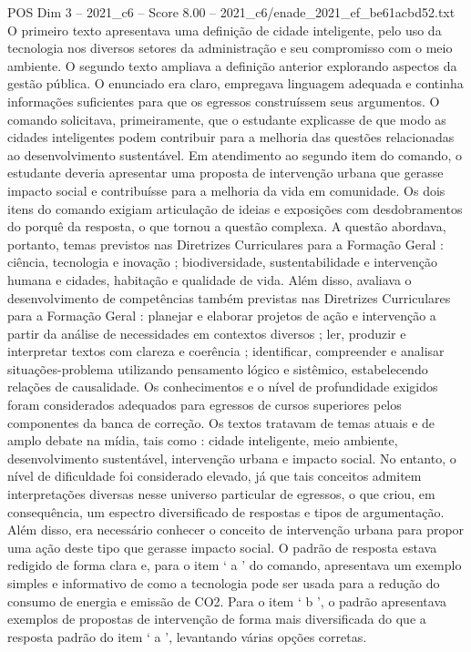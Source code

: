 \begin{textsample}{POS Dim 3 – 2021\_c6 – Score 8.00 – 2021\_c6/enade\_2021\_ef\_be61acbd52.txt}
O primeiro texto apresentava uma definição de cidade inteligente, pelo uso da tecnologia nos diversos setores da administração e seu compromisso com o meio ambiente.
O segundo texto ampliava a definição anterior explorando aspectos da gestão pública.
O enunciado era claro, empregava linguagem adequada e continha informações suficientes para que os egressos construíssem seus argumentos.
O comando solicitava, primeiramente, que o estudante explicasse de que modo as cidades inteligentes podem contribuir para a melhoria das questões relacionadas ao desenvolvimento sustentável.
Em atendimento ao segundo item do comando, o estudante deveria apresentar uma proposta de intervenção urbana que gerasse impacto social e contribuísse para a melhoria da vida em comunidade.
Os dois itens do comando exigiam articulação de ideias e exposições com desdobramentos do porquê da resposta, o que tornou a questão complexa.
A questão abordava, portanto, temas previstos nas Diretrizes Curriculares para a Formação Geral : ciência, tecnologia e inovação ; biodiversidade, sustentabilidade e intervenção humana e cidades, habitação e qualidade de vida.
Além disso, avaliava o desenvolvimento de competências também previstas nas Diretrizes Curriculares para a Formação Geral : planejar e elaborar projetos de ação e intervenção a partir da análise de necessidades em contextos diversos ; ler, produzir e interpretar textos com clareza e coerência ; identificar, compreender e analisar situações-problema utilizando pensamento lógico e sistêmico, estabelecendo relações de causalidade.
Os conhecimentos e o nível de profundidade exigidos foram considerados adequados para egressos de cursos superiores pelos componentes da banca de correção.
Os textos tratavam de temas atuais e de amplo debate na mídia, tais como : cidade inteligente, meio ambiente, desenvolvimento sustentável, intervenção urbana e impacto social.
No entanto, o nível de dificuldade foi considerado elevado, já que tais conceitos admitem interpretações diversas nesse universo particular de egressos, o que criou, em consequência, um espectro diversificado de respostas e tipos de argumentação.
Além disso, era necessário conhecer o conceito de intervenção urbana para propor uma ação deste tipo que gerasse impacto social.
O padrão de resposta estava redigido de forma clara e, para o item ‘ a ’ do comando, apresentava um exemplo simples e informativo de como a tecnologia pode ser usada para a redução do consumo de energia e emissão de CO2.
Para o item ‘ b ’, o padrão apresentava exemplos de propostas de intervenção de forma mais diversificada do que a resposta padrão do item ‘ a ’, levantando várias opções corretas.

\end{textsample}
